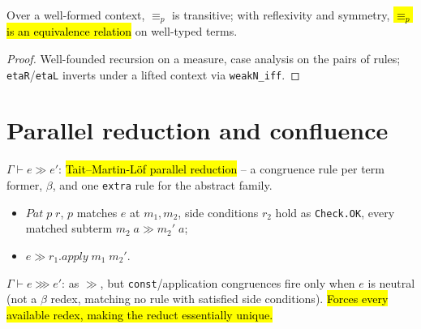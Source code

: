 \begin{theorem}
\label{thm:normaleq-trans}
\leanok
{}

 Over a well-formed context, $\equiv_p$ is transitive; with reflexivity and
symmetry, \hl{$\equiv_p$ is an equivalence relation} on well-typed terms.
\end{theorem}
\begin{proof}
\leanok
{} Well-founded recursion on a measure, case analysis on the pairs of rules;
\texttt{etaR}/\texttt{etaL} inverts under a lifted context via \texttt{weakN\_iff}.
\end{proof}

\section{Parallel reduction and confluence}

\begin{definition}
\label{def:parred}
\leanok
{}

 $\Gamma\vdash e\gg e'$: \hl{Tait--Martin-L\"of parallel reduction} -- a
congruence rule per term former, $\beta$, and one \texttt{extra} rule for the abstract family.
\begin{itemize}
\item {} $Pat\;p\;r$, $p$ matches $e$ at $m_1,m_2$, side conditions $r_2$ hold as
      \texttt{Check.OK}, every matched subterm $m_2\;a\gg m_2'\;a$;
\item {} $e\gg r_1.apply\;m_1\;m_2'$.
\end{itemize}
\end{definition}

\begin{definition}
\label{def:cparred}
\leanok
{}

 $\Gamma\vdash e\ggg e'$: as $\gg$, but \texttt{const}/application congruences
fire only when $e$ is neutral (not a $\beta$ redex, matching no rule with satisfied side
conditions). \hl{Forces every available redex, making the reduct essentially unique.}
\end{definition}

